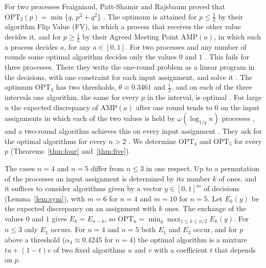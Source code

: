 \documentclass[11pt]{article}
\newcommand{\OPT}{\mathrm{OPT}}
\newcommand{\h}{\tfrac12}
\begin{document}
For two processes Fraigniaud, Patt-Shamir and Rajsbaum proved that $\OPT_2(p)=\min\{q,\,p^2+q^2\}$ \cite[Theorem~3]{FPR}. The optimum is attained for $p\le\h$ by their algorithm Flip Value (FV), in which a process that receives the other value decides it, and for $p\ge\h$ by their Agreed Meeting Point AMP$(a)$, in which such a process decides $a$, for any $a\in[0,1]$. For two processes and any number of rounds some optimal algorithm decides only the values $0$ and $1$ \cite[Section~4.2]{FPR}. This fails for three processes. There they write the one-round problem as a linear program in the decisions, with one constraint for each input assignment, and solve it \cite[Section~5.1]{FPR}. The optimum $\OPT_3$ has two thresholds, $\theta\approx0.3461$ and $\h$, and on each of the three intervals one algorithm, the same for every $p$ in the interval, is optimal \cite[Theorem~13]{FPR}. For large $n$ the expected discrepancy of AMP$(a)$ after one round tends to $0$ on the input assignments in which each of the two values is held by $\omega(\log_{1/q}n)$ processes \cite[Theorem~14]{FPR}, and a two-round algorithm achieves this on every input assignment \cite[Theorem~15]{FPR}. They ask for the optimal algorithms for every $n>2$ \cite[Section~7]{FPR}. We determine $\OPT_4$ and $\OPT_5$ for every $p$ (Theorems~\ref{thm:four} and~\ref{thm:five}).

The cases $n=4$ and $n=5$ differ from $n\le3$ in one respect. Up to a permutation of the processes an input assignment is determined by its number $k$ of ones, and it suffices to consider algorithms given by a vector $y\in[0,1]^m$ of decisions (Lemma~\ref{lem:sym}), with $m=6$ for $n=4$ and $m=10$ for $n=5$. Let $E_k(y)$ be the expected discrepancy on an assignment with $k$ ones. The exchange of the values $0$ and $1$ gives $E_k=E_{n-k}$, so $\OPT_n=\min_y\max_{1\le k\le n/2}E_k(y)$. For $n\le3$ only $E_1$ occurs. For $n=4$ and $n=5$ both $E_1$ and $E_2$ occur, and for $p$ above a threshold ($\alpha_4\approx0.4245$ for $n=4$) the optimal algorithm is a mixture $tu+(1-t)v$ of two fixed algorithms $u$ and $v$ with a coefficient $t$ that depends on $p$.
\end{document}
